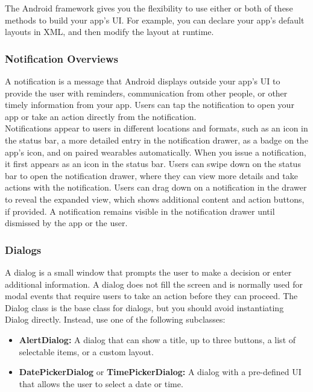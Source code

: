 \documentclass[14pt]{report}
\begin{document}
					The Android framework gives you the flexibility to use either or both of these methods to build your app's UI. For example, you can declare your app's default layouts in XML, and then modify the layout at runtime.

				\subsubsection{Notification Overviews}
					A notification is a message that Android displays outside your app's UI to provide the user with reminders, communication from other people, or other timely information from your app. Users can tap the notification to open your app or take an action directly from the notification.\\

					Notifications appear to users in different locations and formats, such as an icon in the status bar, a more detailed entry in the notification drawer, as a badge on the app's icon, and on paired wearables automatically. When you issue a notification, it first appears as an icon in the status bar. Users can swipe down on the status bar to open the notification drawer, where they can view more details and take actions with the notification. Users can drag down on a notification in the drawer to reveal the expanded view, which shows additional content and action buttons, if provided. A notification remains visible in the notification drawer until dismissed by the app or the user.
			
				\subsubsection{Dialogs}
					A dialog is a small window that prompts the user to make a decision or enter additional information. A dialog does not fill the screen and is normally used for modal events that require users to take an action before they can proceed. The Dialog class is the base class for dialogs, but you should avoid instantiating Dialog directly. Instead, use one of the following subclasses:
					\begin{itemize}
						\item \textbf{AlertDialog:} A dialog that can show a title, up to three buttons, a list of selectable items, or a custom layout.
						\item \textbf{DatePickerDialog} or \textbf{TimePickerDialog:} A dialog with a pre-defined UI that allows the user to select a date or time.
					\end{itemize}
					
\end{document}
